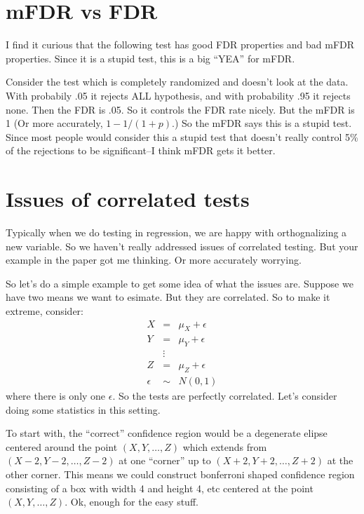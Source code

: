 \documentclass[14pt]{extarticle}
\begin{document}
\section{mFDR vs FDR}

I find it curious that the following test has good FDR properties and
bad mFDR properties.  Since it is a stupid test, this is a big ``YEA''
for mFDR.

Consider the test which is completely randomized and doesn't look at
 the data.  With probabily .05 it rejects ALL hypothesis, and with
 probability .95 it rejects none.  Then the FDR is .05.  So it
 controls the FDR rate nicely.  But the mFDR is 1 (Or more accurately,
 $1 - 1/(1+p)$.)  So the mFDR says this is a stupid test.  Since most
people would consider this a stupid test that doesn't really control
5\% of the rejections to be significant--I think mFDR gets it better.  

\section{Issues of correlated tests}

Typically when we do testing in regression, we are happy with
orthognalizing a new variable.  So we haven't really addressed issues
of correlated testing.  But your example in the paper got me
thinking.  Or more accurately worrying.

So let's do a simple example to get some idea of what the issues are.
Suppose we have two means we want to esimate.  But they are
correlated.  So to make it extreme, consider:
\begin{eqnarray*}
X & = & \mu_X + \epsilon \\
Y & = & \mu_Y + \epsilon \\
& \vdots & \\
Z & = & \mu_Z + \epsilon \\
\epsilon & \sim & N(0,1)
\end{eqnarray*}
where there is only one $\epsilon$.  So the tests are perfectly
 correlated.  Let's consider doing some statistics in this setting. 

To start with, the ``correct'' confidence region would be a degenerate
 elipse centered around the point $(X,Y,\ldots,Z)$ which extends from
 $(X-2,Y-2,\ldots,Z-2)$ at one ``corner'' up to $(X+2,Y+2,\ldots,Z+2)$
 at the other corner.  This means we could construct bonferroni shaped
 confidence region consisting of a box with width 4 and height 4, etc
 centered at the point $(X,Y,\dots,Z)$.  Ok, enough for the easy
 stuff.
\end{document}

